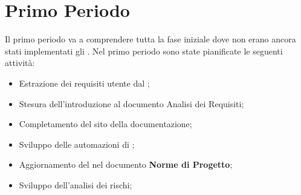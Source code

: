 \section{Primo Periodo}

\label{sec:PrimoPeriodo}
Il primo periodo va a comprendere tutta la fase iniziale dove non erano ancora stati implementati gli .
Nel primo periodo sono state pianificate le seguenti attività:
\begin{itemize}
    \item Estrazione dei requisiti utente dal ;
    \item Stesura dell'introduzione al documento Analisi dei Requisiti;
    \item Completamento del sito della documentazione;
    \item Sviluppo delle automazioni di ; 
    \item Aggiornamento del \textbf{} nel documento \textbf{Norme di Progetto};
    \item Sviluppo dell'analisi dei rischi;
\end{itemize}





